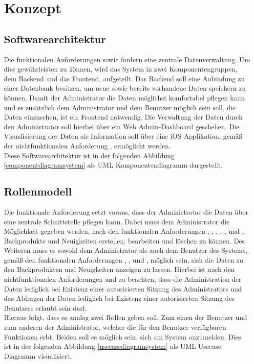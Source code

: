 \chapter{Konzept}

\section{Softwarearchitektur} \label{softwarearchitektur}
Die funktionalen Anforderungen  sowie  fordern eine zentrale Datenverwaltung.
Um dies gewährleisten zu können, wird das System in zwei Komponentengruppen, dem Backend und das Frontend, aufgeteilt.
Das Backend soll eine Anbindung zu einer Datenbank besitzen, um neue sowie bereits vorhandene Daten speichern zu können.
Damit der Administrator die Daten möglichst komfortabel pflegen kann und es zusätzlich dem Administrator und dem Benutzer möglich sein soll, die Daten einzusehen, ist ein Frontend notwendig. Die Verwaltung der Daten durch den Administrator soll hierbei über ein Web Admin-Dashboard geschehen. Die Visualisierung der Daten als Information soll über eine iOS Applikation, gemäß der nichtfunktionalen Anforderung , ermöglicht werden.
\\
Diese Softwarearchitektur ist in der folgenden Abbildung \ref{componentdiagramsystem} als UML Komponentendiagramm dargestellt.


\clearpage

\section{Rollenmodell} \label{rollenmodell}
Die funktionale Anforderung  setzt voraus, dass der Administrator die Daten über eine zentrale Schnittstelle pflegen kann. Dabei muss dem Administrator die Möglichkeit gegeben werden, nach den funktionalen Anforderungen , , , , , und , Backprodukte und Neuigkeiten erstellen, bearbeiten und löschen zu können.
Des Weiteren muss es sowohl dem Administrator als auch dem Benutzer des Systems, gemäß den funktionalen Anforderungen , ,  und , möglich sein, sich die Daten zu den Backprodukten und Neuigkeiten anzeigen zu lassen. Hierbei ist nach den nichtfunktionalen Anforderungen  und  zu beachten, dass die Administration der Daten lediglich bei Existenz einer autorisierten Sitzung des Administrators und das Abfragen der Daten lediglich bei Existenz einer autorisierten Sitzung des Benutzers erlaubt sein darf.
\\
Hieraus folgt, dass es analog zwei Rollen geben soll. Zum einen der Benutzer und zum anderen der Administrator, welcher die für den Benutzer verfügbaren Funktionen erbt. Beiden soll es möglich sein, sich am System anzumelden.
Dies ist in der folgenden Abbildung \ref{usecasediagramsystem} als UML Usecase Diagramm visualisiert.

